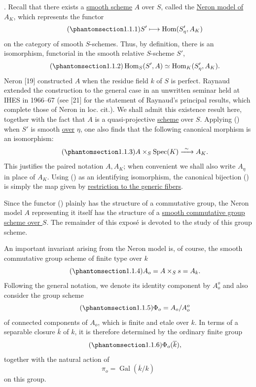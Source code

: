 \medskip
\noindent
{}. Recall that there exists a \underline{smooth scheme} $A$ over
$S$, called the \underline{Neron model of $A_K$}, which represents the
functor
\begin{equation}\tag{\SGARefTarget{sga7.sga7i.eix.n1-1-1}{1.1.1}}
 S'\longmapsto\operatorname{Hom}(S'_\eta,A_K)
\end{equation}
on the category of smooth $S$-schemes.  Thus, by definition, there is
an isomorphism, functorial in the smooth relative $S$-scheme $S'$,
\begin{equation}\tag{\SGARefTarget{sga7.sga7i.eix.n1-1-2}{1.1.2}}
 \operatorname{Hom}_S(S',A)\simeq
 \operatorname{Hom}_K(S'_\eta,A_K).
\end{equation}
Neron [19] constructed $A$ when the residue field $k$ of $S$ is
perfect.  Raynaud extended the construction to the general case in an
unwritten seminar held at IHES in 1966--67 (see [21] for the statement
of Raynaud's principal results, which complete those of Neron in
loc. cit.).  We shall admit this existence result here, together with
the fact that $A$ is a quasi-projective \underline{scheme} over $S$.
Applying () when $S'$ is smooth \underline{over} $\eta$, one also
finds that the following canonical morphism is an isomorphism:
\begin{equation}\tag{\SGARefTarget{sga7.sga7i.eix.n1-1-3}{1.1.3}}
 A\times_S\operatorname{Spec}(K)\xrightarrow{\ \sim\ }A_K.
\end{equation}
This justifies the paired notation $A,A_K$; when convenient we shall
also write $A_\eta$ in place of $A_K$.  Using () as an identifying
isomorphism, the canonical bijection () is simply the map given by
\underline{restriction to the generic fibers}.

Since the functor () plainly has the structure of a commutative
group, the Neron model $A$ representing it itself has the structure of
a \underline{smooth commutative group scheme over $S$}.  The remainder
of this expos\'e is devoted to the study of this group scheme.

An important invariant arising from the Neron model is, of course, the
smooth commutative group scheme of finite type over $k$
\begin{equation}\tag{\SGARefTarget{sga7.sga7i.eix.n1-1-4}{1.1.4}}
 A_o=A\times_Ss=A_k.
\end{equation}
Following the general notation, we denote its identity component by
$A_o^o$ and also consider the group scheme
\begin{equation}\tag{\SGARefTarget{sga7.sga7i.eix.n1-1-5}{1.1.5}}
 \Phi_o=A_o/A_o^o
\end{equation}
of connected components of $A_o$, which is finite and etale over $k$.
In terms of a separable closure $\overline k$ of $k$, it is therefore
determined by the ordinary finite group
\begin{equation}\tag{\SGARefTarget{sga7.sga7i.eix.n1-1-6}{1.1.6}}
 \Phi_o(\overline k),
\end{equation}
together with the natural action of
\[
 \pi_o=\operatorname{Gal}(\overline k/k)
\]
on this group.

